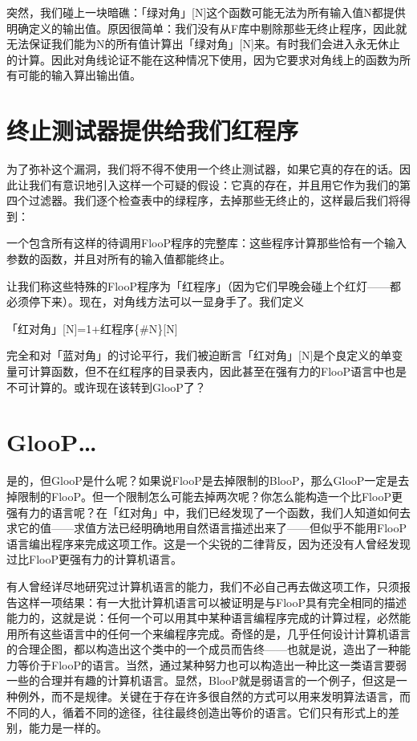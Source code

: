 \documentclass[
  12pt,
  twoside,
  openright,
  oldfontcommands,
]{memoir}
\begin{document}
突然，我们碰上一块暗礁：「绿对角」{[}N{]}这个函数可能无法为所有输入值N都提供明确定义的输出值。原因很简单：我们没有从F库中剔除那些无终止程序，因此就无法保证我们能为N的所有值计算出「绿对角」{[}N{]}来。有时我们会进入永无休止的计算。因此对角线论证不能在这种情况下使用，因为它要求对角线上的函数为所有可能的输入算出输出值。

\section{终止测试器提供给我们红程序}

为了弥补这个漏洞，我们将不得不使用一个终止测试器，如果它真的存在的话。因此让我们有意识地引入这样一个可疑的假设：它真的存在，并且用它作为我们的第四个过滤器。我们逐个检查表中的绿程序，去掉那些无终止的，这样最后我们将得到：

一个包含所有这样的待调用FlooP程序的完整库：这些程序计算那些恰有一个输入参数的函数，并且对所有的输入值都能终止。

让我们称这些特殊的FlooP程序为「红程序」（因为它们早晚会碰上个红灯------都必须停下来）。现在，对角线方法可以一显身手了。我们定义

「红对角」{[}N{]}=1+红程序\{\#N\}{[}N{]}

完全和对「蓝对角」的讨论平行，我们被迫断言「红对角」{[}N{]}是个良定义的单变量可计算函数，但不在红程序的目录表内，因此甚至在强有力的FlooP语言中也是不可计算的。或许现在该转到GlooP了？

\section{GlooP\ldots{}}

是的，但GlooP是什么呢？如果说FlooP是去掉限制的BlooP，那么GlooP一定是去掉限制的FlooP。但一个限制怎么可能去掉两次呢？你怎么能构造一个比FlooP更强有力的语言呢？在「红对角」中，我们已经发现了一个函数，我们人知道如何去求它的值------求值方法已经明确地用自然语言描述出来了------但似乎不能用FlooP语言编出程序来完成这项工作。这是一个尖锐的二律背反，因为还没有人曾经发现过比FlooP更强有力的计算机语言。

有人曾经详尽地研究过计算机语言的能力，我们不必自己再去做这项工作，只须报告这样一项结果：有一大批计算机语言可以被证明是与FlooP具有完全相同的描述能力的，这就是说：任何一个可以用其中某种语言编程序完成的计算过程，必然能用所有这些语言中的任何一个来编程序完成。奇怪的是，几乎任何设计计算机语言的合理企图，都以构造出这个类中的一个成员而告终------也就是说，造出了一种能力等价于FlooP的语言。当然，通过某种努力也可以构造出一种比这一类语言要弱一些的合理并有趣的计算机语言。显然，BlooP就是弱语言的一个例子，但这是一种例外，而不是规律。关键在于存在许多很自然的方式可以用来发明算法语言，而不同的人，循着不同的途径，往往最终创造出等价的语言。它们只有形式上的差别，能力是一样的。
\end{document}
